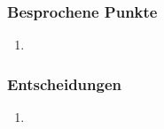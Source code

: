 \documentclass[a4paper, table]{article}
\begin{document}
\subsubsection*{Besprochene Punkte}

\begin{enumerate}
    \item 
\end{enumerate}

\subsubsection*{Entscheidungen}

\begin{enumerate}
    \item 
\end{enumerate}
\end{document}
